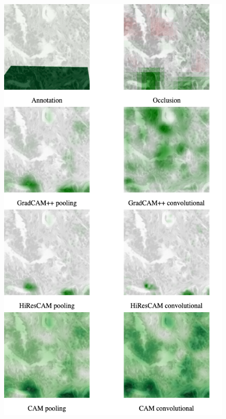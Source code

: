 \begin{figure}
    \begin{center}
    \begin{minipage}{0.5\textwidth}
      \includegraphics[width=\textwidth]{img/conv-vs-pool.png}
    \end{minipage}

\end{center}
\end{figure}
